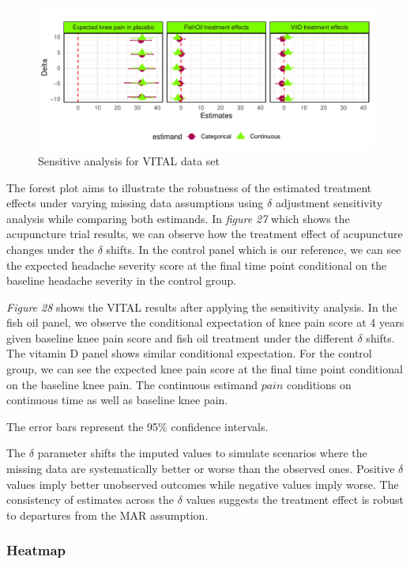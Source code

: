 \documentclass{article}
\newcommand{\pandocbounded}[1]{#1}
\begin{document}
\begin{figure}
\centering
\pandocbounded{\includegraphics[keepaspectratio]{Final_Report_files/figure-latex/unnamed-chunk-34-1.pdf}}
\caption{Sensitive analysis for VITAL data set}
\end{figure}

The forest plot aims to illustrate the robustness of the estimated
treatment effects under varying missing data assumptions using
\(\delta\) adjustment sensitivity analysis while comparing both
estimands. In \emph{figure 27} which shows the acupuncture trial
results, we can observe how the treatment effect of acupuncture changes
under the \(\delta\) shifts. In the control panel which is our
reference, we can see the expected headache severity score at the final
time point conditional on the baseline headache severity in the control
group.

\emph{Figure 28} shows the VITAL results after applying the sensitivity
analysis. In the fish oil panel, we observe the conditional expectation
of knee pain score at 4 years given baseline knee pain score and fish
oil treatment under the different \(\delta\) shifts. The vitamin D panel
shows similar conditional expectation. For the control group, we can see
the expected knee pain score at the final time point conditional on the
baseline knee pain. The continuous estimand \(pain\) conditions on
continuous time as well as baseline knee pain.

The error bars represent the 95\% confidence intervals.

The \(\delta\) parameter shifts the imputed values to simulate scenarios
where the missing data are systematically better or worse than the
observed ones. Positive \(\delta\) values imply better unobserved
outcomes while negative values imply worse. The consistency of estimates
across the \(\delta\) values suggests the treatment effect is robust to
departures from the MAR assumption.

\subsubsection{Heatmap}\label{heatmap}
\end{document}
